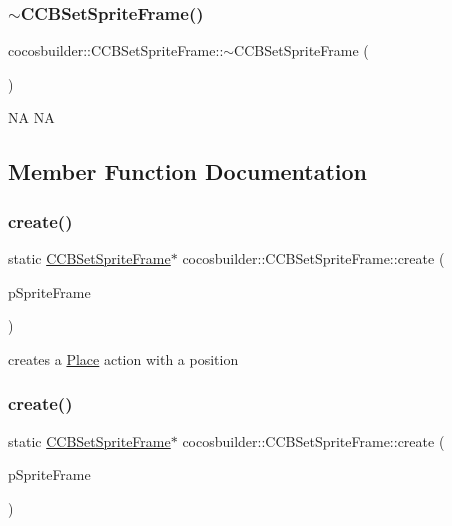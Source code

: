 \subsubsection{\texorpdfstring{$\sim$\+C\+C\+B\+Set\+Sprite\+Frame()}{~CCBSetSpriteFrame()}\hspace{0.1cm}{\footnotesize\ttfamily [2/2]}}
{\footnotesize\ttfamily cocosbuilder\+::\+C\+C\+B\+Set\+Sprite\+Frame\+::$\sim$\+C\+C\+B\+Set\+Sprite\+Frame (\begin{DoxyParamCaption}{ }\end{DoxyParamCaption})}

NA  NA 

\subsection{Member Function Documentation}
\mbox{\label{classcocosbuilder_1_1CCBSetSpriteFrame_a0d788e548c11993675b553040dbdbf4e}} 
\subsubsection{\texorpdfstring{create()}{create()}\hspace{0.1cm}{\footnotesize\ttfamily [1/2]}}
{\footnotesize\ttfamily static \hyperlink{classcocosbuilder_1_1CCBSetSpriteFrame}{C\+C\+B\+Set\+Sprite\+Frame}$\ast$ cocosbuilder\+::\+C\+C\+B\+Set\+Sprite\+Frame\+::create (\begin{DoxyParamCaption}\item[{cocos2d\+::\+Sprite\+Frame $\ast$}]{p\+Sprite\+Frame }\end{DoxyParamCaption})\hspace{0.3cm}{\ttfamily [static]}}

creates a \hyperlink{classPlace}{Place} action with a position \mbox{\label{classcocosbuilder_1_1CCBSetSpriteFrame_a0d788e548c11993675b553040dbdbf4e}} 
\subsubsection{\texorpdfstring{create()}{create()}\hspace{0.1cm}{\footnotesize\ttfamily [2/2]}}
{\footnotesize\ttfamily static \hyperlink{classcocosbuilder_1_1CCBSetSpriteFrame}{C\+C\+B\+Set\+Sprite\+Frame}$\ast$ cocosbuilder\+::\+C\+C\+B\+Set\+Sprite\+Frame\+::create (\begin{DoxyParamCaption}\item[{cocos2d\+::\+Sprite\+Frame $\ast$}]{p\+Sprite\+Frame }\end{DoxyParamCaption})\hspace{0.3cm}{\ttfamily [static]}}


